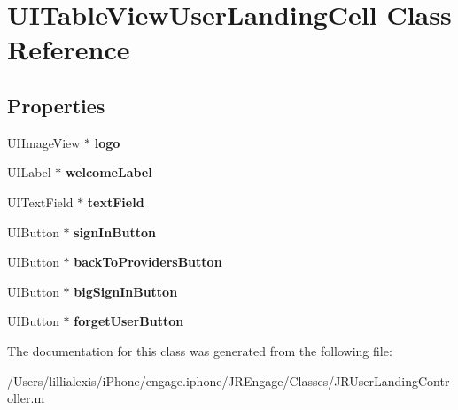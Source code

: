 \hypertarget{interface_u_i_table_view_user_landing_cell}{
\section{UITableViewUserLandingCell Class Reference}
\label{interface_u_i_table_view_user_landing_cell}
}
\subsection*{Properties}
\begin{DoxyCompactItemize}
\item 
\hypertarget{interface_u_i_table_view_user_landing_cell_a4887cf9ff4cf944eaabcebb9fef5e8b2}{
UIImageView $\ast$ {\bfseries logo}}
\label{interface_u_i_table_view_user_landing_cell_a4887cf9ff4cf944eaabcebb9fef5e8b2}

\item 
\hypertarget{interface_u_i_table_view_user_landing_cell_aaae38b13ef61485596580ae82e60cd74}{
UILabel $\ast$ {\bfseries welcomeLabel}}
\label{interface_u_i_table_view_user_landing_cell_aaae38b13ef61485596580ae82e60cd74}

\item 
\hypertarget{interface_u_i_table_view_user_landing_cell_a6b7b78171b454ed36b7e75e51539fb54}{
UITextField $\ast$ {\bfseries textField}}
\label{interface_u_i_table_view_user_landing_cell_a6b7b78171b454ed36b7e75e51539fb54}

\item 
\hypertarget{interface_u_i_table_view_user_landing_cell_a33d3577f71b7a097feafc884d7a86371}{
UIButton $\ast$ {\bfseries signInButton}}
\label{interface_u_i_table_view_user_landing_cell_a33d3577f71b7a097feafc884d7a86371}

\item 
\hypertarget{interface_u_i_table_view_user_landing_cell_adbfcabe1a605b7a61e981ffb0808c8fa}{
UIButton $\ast$ {\bfseries backToProvidersButton}}
\label{interface_u_i_table_view_user_landing_cell_adbfcabe1a605b7a61e981ffb0808c8fa}

\item 
\hypertarget{interface_u_i_table_view_user_landing_cell_ad1a8165e8c9a5588495516f41125c119}{
UIButton $\ast$ {\bfseries bigSignInButton}}
\label{interface_u_i_table_view_user_landing_cell_ad1a8165e8c9a5588495516f41125c119}

\item 
\hypertarget{interface_u_i_table_view_user_landing_cell_a5ff78e73d4e5af193e4c067bf83a7cbd}{
UIButton $\ast$ {\bfseries forgetUserButton}}
\label{interface_u_i_table_view_user_landing_cell_a5ff78e73d4e5af193e4c067bf83a7cbd}

\end{DoxyCompactItemize}


The documentation for this class was generated from the following file:\begin{DoxyCompactItemize}
\item 
/Users/lillialexis/iPhone/engage.iphone/JREngage/Classes/JRUserLandingController.m\end{DoxyCompactItemize}
